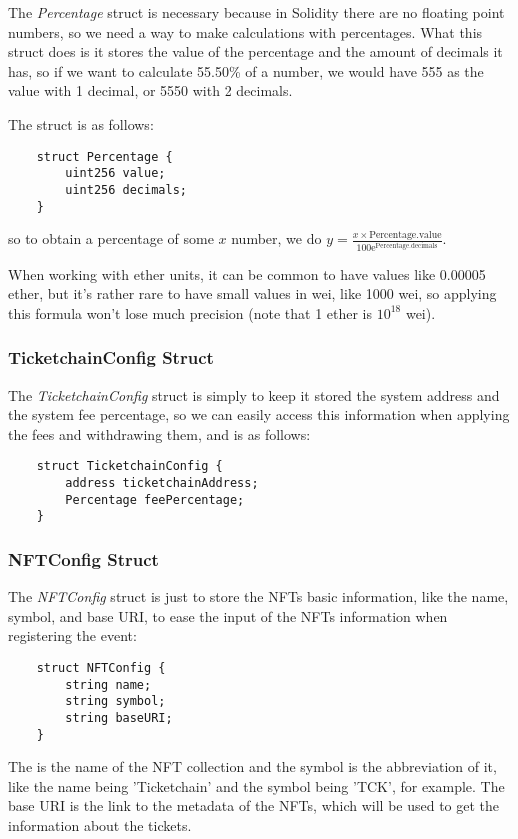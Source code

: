 The \textit{Percentage} struct is necessary because in Solidity there are no floating point numbers, so we need a way to make calculations with percentages. What this struct does is it stores the value of the percentage and the amount of decimals it has, so if we want to calculate 55.50\% of a number, we would have 555 as the value with 1 decimal, or 5550 with 2 decimals.

The struct is as follows:
\begin{verbatim}
    struct Percentage {
        uint256 value;
        uint256 decimals;
    }
\end{verbatim}
so to obtain a percentage of some $x$ number, we do $y = \frac{x \times \text{Percentage.value}}{100\mathrm{e}^\text{Percentage.decimals}}$.

When working with ether units, it can be common to have values like 0.00005 ether, but it's rather rare to have small values in wei, like 1000 wei, so applying this formula won't lose much precision (note that 1 ether is $10^{18}$ wei).

\subsubsection{TicketchainConfig Struct}

The \textit{TicketchainConfig} struct is simply to keep it stored the system address and the system fee percentage, so we can easily access this information when applying the fees and withdrawing them, and is as follows:
\begin{verbatim}
    struct TicketchainConfig {
        address ticketchainAddress;
        Percentage feePercentage;
    }
\end{verbatim}

\subsubsection{NFTConfig Struct}

The \textit{NFTConfig} struct is just to store the NFTs basic information, like the name, symbol, and base URI, to ease the input of the NFTs information when registering the event:
\begin{verbatim}
    struct NFTConfig {
        string name;
        string symbol;
        string baseURI;
    }
\end{verbatim}
The is the name of the NFT collection and the symbol is the abbreviation of it, like the name being 'Ticketchain' and the symbol being 'TCK', for example. The base URI is the link to the metadata of the NFTs, which will be used to get the information about the tickets.


